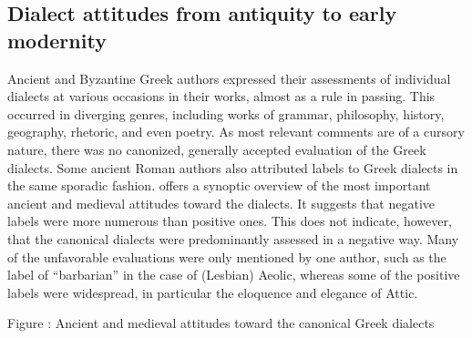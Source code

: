 \subsection{Dialect attitudes from antiquity to early modernity}
\hypertarget{Toc19704851}{}
Ancient and Byzantine Greek authors expressed their assessments of individual dialects at various occasions in their works, almost as a rule in passing. This occurred in diverging genres, including works of grammar, philosophy, history, geography, rhetoric, and even poetry. As most relevant comments are of a cursory nature, there was no canonized, generally accepted evaluation of the Greek dialects. Some ancient Roman authors also attributed labels to Greek dialects in the same sporadic fashion.  offers a synoptic overview of the most important ancient and medieval attitudes toward the dialects. It suggests that negative labels were more numerous than positive ones. This does not indicate, however, that the canonical dialects were predominantly assessed in a negative way. Many of the unfavorable evaluations were only mentioned by one author, such as the label of “barbarian” in the case of (Lesbian) Aeolic, whereas some of the positive labels were widespread, in particular the eloquence and elegance of Attic.

\begin{stylecaption}
Figure : Ancient and medieval attitudes toward the canonical Greek dialects
\end{stylecaption}

\tablefirsthead{}

